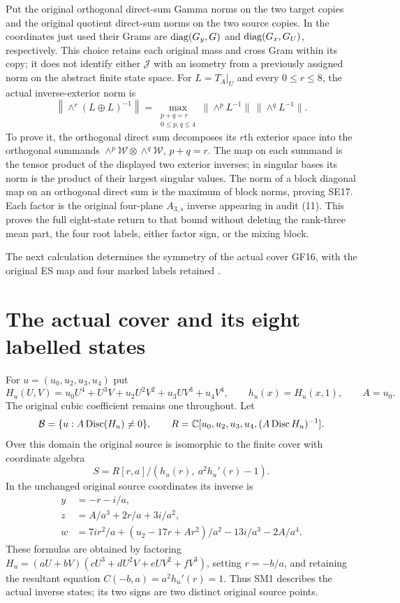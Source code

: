 Put the original orthogonal direct-sum Gamma norms on the two target
copies and the original quotient direct-sum norms on the two source
copies. In the coordinates just used their Grams are
$\operatorname{diag}(G_y,G)$ and $\operatorname{diag}(G_x,G_U)$, respectively. This choice
retains each original mass and cross Gram within its copy; it does
not identify either $\mathcal J$ with an isometry from a previously
assigned norm on the abstract finite state space. For $L=T_A|_U$
and every $0\le r\le8$, the actual inverse-exterior norm is
\[
 \left\|\wedge^r(L\oplus L)^{-1}\right\|
 =\max_{\substack{p+q=r\\0\le p,q\le4}}
          \|\wedge^pL^{-1}\|\,\|\wedge^qL^{-1}\|.
 \tag{SE17}
\]
To prove it, the orthogonal direct sum decomposes its $r$th exterior
space into the orthogonal summands
$\wedge^p\mathcal W\otimes\wedge^q\mathcal W$, $p+q=r$.
The map on each summand is the tensor product of the displayed
two exterior inverses; in singular bases its norm is the product
of their largest singular values. The norm of a block diagonal
map on an orthogonal direct sum is the maximum of block norms,
proving SE17. Each factor is the original four-plane $A_{3,s}$
inverse appearing in audit (11). This proves the full eight-state
return to that bound without deleting the rank-three mean part,
the four root labels, either factor sign, or the mixing block.

\providecommand{\Disc}{\operatorname{Disc}}
\providecommand{\sgn}{\operatorname{sgn}}
\providecommand{\Aut}{\operatorname{Aut}}
The next calculation determines the symmetry of the actual cover GF16,
with the original ES map and four marked labels retained \cite{fullfable:ES488}.

\section{The actual cover and its eight labelled states}
For $u=(u_0,u_2,u_3,u_4)$ put
\[
 H_u(U,V)=u_0U^4+U^3V+u_2U^2V^2+u_3UV^3+u_4V^4,
 \qquad h_u(x)=H_u(x,1),\qquad A=u_0.
\]
The original cubic coefficient remains one throughout. Let
\[
 \mathcal B=\{u:A\Disc(H_u)\ne0\},\qquad
 R=\fullfableC[u_0,u_2,u_3,u_4,(A\Disc H_u)^{-1}].
\]
Over this domain the original source is isomorphic to the finite
cover with coordinate algebra
\begin{equation}
 S=R[r,a]/(h_u(r),\ a^2h_u'(r)-1).\tag{SM1}
\end{equation}
In the unchanged original source coordinates its inverse is
\begin{align}
 y&=-r-i/a,\nonumber\\
 z&=A/a^3+2r/a+3i/a^2,\nonumber\\
 w&=7ir^2/a+(u_2-17r+Ar^2)/a^2-13i/a^3-2A/a^4.
 \tag{SM2}
\end{align}
These formulas are obtained by factoring
$H_u=(aU+bV)(cU^3+dU^2V+eUV^2+fV^3)$, setting $r=-b/a$,
and retaining the resultant equation
$C(-b,a)=a^2h_u'(r)=1$. Thus SM1 describes the actual inverse
states; its two signs are two distinct original source points.

